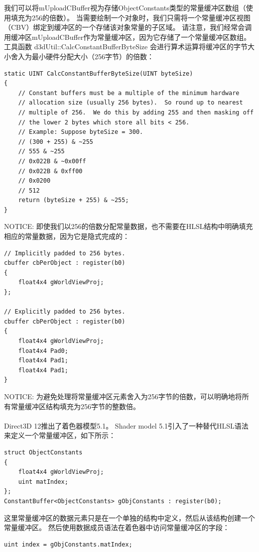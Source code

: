 \documentclass[11pt,a4paper,oldfontcommands]{memoir}
\begin{document}
{\begin{flushleft}
我们可以将mUploadCBuffer视为存储ObjectConstants类型的常量缓冲区数组（使用填充为256的倍数）。 当需要绘制一个对象时，我们只需将一个常量缓冲区视图（CBV）绑定到缓冲区的一个存储该对象常量的子区域。 请注意，我们经常会调用缓冲区mUploadCBuffer作为常量缓冲区，因为它存储了一个常量缓冲区数组。\\
工具函数 d3dUtil::CalcConstantBufferByteSize 会进行算术运算将缓冲区的字节大小舍入为最小硬件分配大小（256字节）的倍数：\\
\begin{lstlisting}
static UINT CalcConstantBufferByteSize(UINT byteSize)
{
    // Constant buffers must be a multiple of the minimum hardware
    // allocation size (usually 256 bytes).  So round up to nearest
    // multiple of 256.  We do this by adding 255 and then masking off
    // the lower 2 bytes which store all bits < 256.
    // Example: Suppose byteSize = 300.
    // (300 + 255) & ~255
    // 555 & ~255
    // 0x022B & ~0x00ff
    // 0x022B & 0xff00
    // 0x0200
    // 512
    return (byteSize + 255) & ~255;
}
\end{lstlisting}
NOTICE: 即使我们以256的倍数分配常量数据，也不需要在HLSL结构中明确填充相应的常量数据，因为它是隐式完成的：\\
\begin{lstlisting}
// Implicitly padded to 256 bytes.
cbuffer cbPerObject : register(b0)
{
    float4x4 gWorldViewProj;
};

// Explicitly padded to 256 bytes.
cbuffer cbPerObject : register(b0)
{
    float4x4 gWorldViewProj;
    float4x4 Pad0;
    float4x4 Pad1;
    float4x4 Pad1;
}
\end{lstlisting}
NOTICE: 为避免处理将常量缓冲区元素舍入为256字节的倍数，可以明确地将所有常量缓冲区结构填充为256字节的整数倍。\\
~\\
Direct3D 12推出了着色器模型5.1。 Shader model 5.1引入了一种替代HLSL语法来定义一个常量缓冲区，如下所示：\\
\begin{lstlisting}
struct ObjectConstants
{
    float4x4 gWorldViewProj;
    uint matIndex;
};
ConstantBuffer<ObjectConstants> gObjConstants : register(b0);
\end{lstlisting}
这里常量缓冲区的数据元素只是在一个单独的结构中定义，然后从该结构创建一个常量缓冲区。 然后使用数据成员语法在着色器中访问常量缓冲区的字段：\\
\begin{lstlisting}
uint index = gObjConstants.matIndex;
\end{lstlisting}
\end{flushleft}

}
\end{document}
